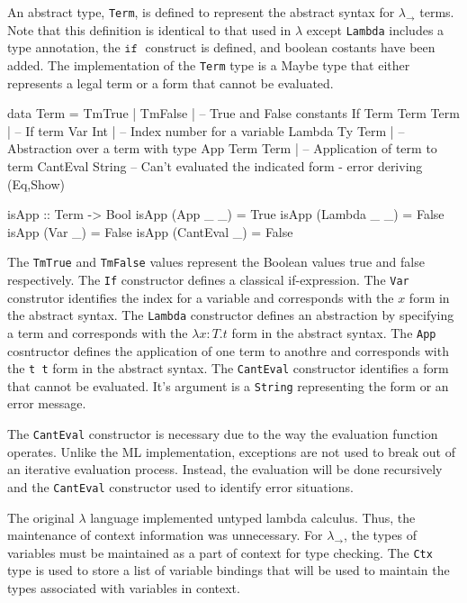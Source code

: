 \documentclass[10pt]{article}
\newcommand{\IF}{\ensuremath{\mathtt{ if \;}}}
\begin{document}
An abstract type, \texttt{Term}, is defined to represent the abstract
syntax for $\lambda_\rightarrow$ terms.  Note that this definition is
identical to that used in $\lambda$ except \texttt{Lambda} includes a
type annotation, the $\IF$ construct is defined, and boolean costants
have been added.  The implementation of the \texttt{Term} type is a
Maybe type that either represents a legal term or a form that cannot
be evaluated.

\begin{code}
  data Term = 
      TmTrue | TmFalse |         -- True and False constants
      If Term Term Term |        -- If term
      Var Int |                  -- Index number for a variable
      Lambda Ty Term |           -- Abstraction over a term with type
      App Term Term |            -- Application of term to term
      CantEval String            -- Can't evaluated the indicated form - error
      deriving (Eq,Show)

  isApp :: Term -> Bool
  isApp (App _ _) = True
  isApp (Lambda _ _) = False
  isApp (Var _) = False
  isApp (CantEval _) = False
\end{code}

The \texttt{TmTrue} and \texttt{TmFalse} values represent the Boolean
values true and false respectively.  The \texttt{If} constructor
defines a classical if-expression.  The \texttt{Var} construtor
identifies the index for a variable and corresponds with the $x$ form
in the abstract syntax.  The \texttt{Lambda} constructor defines an
abstraction by specifying a term and corresponds with the $\lambda
x:T.t$ form in the abstract syntax.  The \texttt{App} cosntructor
defines the application of one term to anothre and corresponds with
the \texttt{t t} form in the abstract syntax.  The \texttt{CantEval}
constructor identifies a form that cannot be evaluated.  It's argument
is a \texttt{String} representing the form or an error message.

The \texttt{CantEval} constructor is necessary due to the way
the evaluation function operates.  Unlike the ML implementation,
exceptions are not used to break out of an iterative evaluation
process.  Instead, the evaluation will be done recursively and the
\texttt{CantEval} constructor used to identify error situations.

The original $\lambda$ language implemented untyped lambda calculus.
Thus, the maintenance of context information was unnecessary.  For
$\lambda_\rightarrow$, the types of variables must be maintained as a
part of context for type checking.  The \texttt{Ctx} type is used to
store a list of variable bindings that will be used to maintain the
types associated with variables in context.
\end{document}
